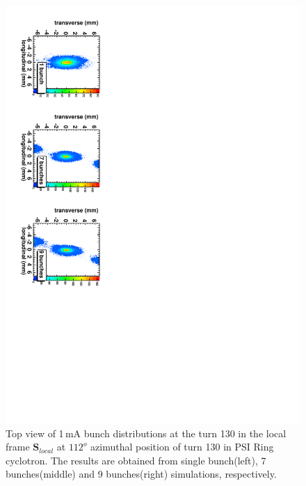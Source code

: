 \documentclass[aps,prstab,twocolumn,superscriptaddress]{revtex4}
\newcommand{\bs}[1]{\mathbf #1}
\begin{document}
\begin{figure}
  \includegraphics[angle=90,width=1\linewidth]{figures/C9B7BSB-2D-1mA-130.pdf}
  \caption{Top view of 1\,mA bunch distributions at the turn 130  in the local frame ${\bs{S}_{local}}$ at $112^o$ azimuthal position of turn 130 in PSI Ring cyclotron.
    The results are obtained from single bunch(left), 7 bunches(middle) and 9 bunches(right) simulations, respectively.}
  \label{fig:NBcompare2D}
\end{figure}
\end{document}
